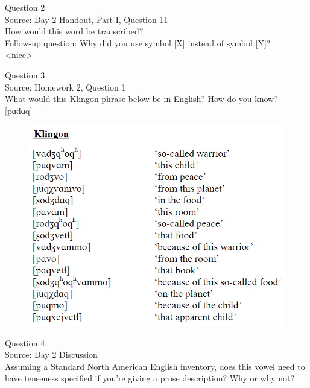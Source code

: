 \documentclass[12pt]{article}
\begin{document}
\newpage

{\large Question 2}\\

Source: Day 2 Handout, Part I, Question 11\\

How would this word be transcribed?\\ Follow-up question: Why did you use symbol [X] instead of symbol [Y]?\\

<nice>


\newpage

{\large Question 3}\\

Source: Homework 2, Question 1\\

What would this Klingon phrase below be in English? How do you know?\\

{[pɑdɑq]}

\begin{figure}[H]
\includegraphics{../images/klingon.png}
\end{figure}

\newpage

{\large Question 4}\\

Source: Day 2 Discussion\\

Assuming a Standard North American English inventory, does this vowel need to have tenseness specified if you're giving a prose description? Why or why not?\\
\end{document}
